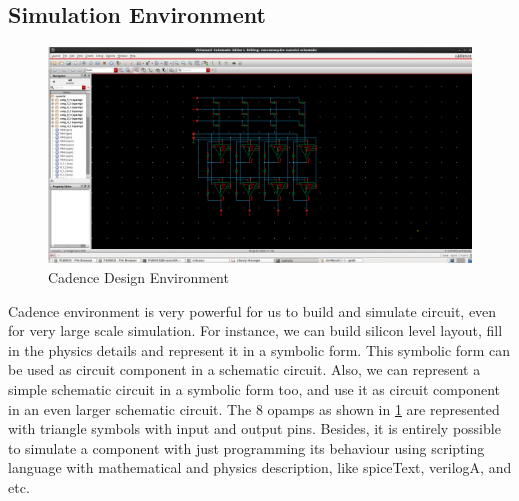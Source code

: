 \subsection{Simulation Environment}
\begin{figure}[H]
	\centering
	\includegraphics[scale=0.3]{cadence.png}
	\caption{Cadence Design Environment}
	\label{fig:cadence}
\end{figure}
Cadence environment is very powerful for us to build and simulate circuit, even for very large scale simulation. For instance, we can build silicon level layout, fill in the physics details and represent it in a symbolic form. This symbolic form can be used as circuit component in a schematic circuit. Also, we can represent a simple schematic circuit in a symbolic form too, and use it as circuit component in an even larger schematic circuit. The 8 opamps as shown in \ref{fig:cadence} are represented with triangle symbols with input and output pins. Besides, it is entirely possible to simulate a component with just programming its behaviour using scripting language with mathematical and physics description, like spiceText, verilogA, and etc.

